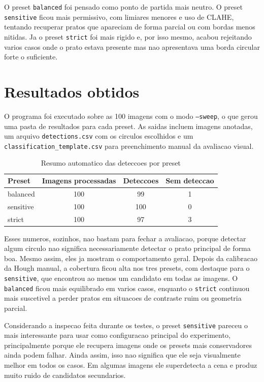 \documentclass[12pt,a4paper]{article}
\begin{document}
O preset \texttt{balanced} foi pensado como ponto de partida mais neutro. O preset \texttt{sensitive} ficou mais permissivo, com limiares menores e uso de CLAHE, tentando recuperar pratos que apareciam de forma parcial ou com bordas menos nitidas. Ja o preset \texttt{strict} foi mais rigido e, por isso mesmo, acabou rejeitando varios casos onde o prato estava presente mas nao apresentava uma borda circular forte o suficiente.

\section{Resultados obtidos}

O programa foi executado sobre as 100 imagens com o modo \texttt{--sweep}, o que gerou uma pasta de resultados para cada preset. As saidas incluem imagens anotadas, um arquivo \texttt{detections.csv} com os circulos escolhidos e um \texttt{classification\_template.csv} para preenchimento manual da avaliacao visual.

\begin{table}[H]
    \centering
    \caption{Resumo automatico das deteccoes por preset}
    \begin{tabular}{lccc}
        \toprule
        Preset & Imagens processadas & Deteccoes & Sem deteccao \\
        \midrule
        balanced  & 100 & 99  & 1 \\
        sensitive & 100 & 100 & 0 \\
        strict    & 100 & 97  & 3 \\
        \bottomrule
    \end{tabular}
\end{table}

Esses numeros, sozinhos, nao bastam para fechar a avaliacao, porque detectar algum circulo nao significa necessariamente detectar o prato principal de forma boa. Mesmo assim, eles ja mostram o comportamento geral. Depois da calibracao da Hough manual, a cobertura ficou alta nos tres presets, com destaque para o \texttt{sensitive}, que encontrou ao menos um candidato em todas as imagens. O \texttt{balanced} ficou mais equilibrado em varios casos, enquanto o \texttt{strict} continuou mais suscetivel a perder pratos em situacoes de contraste ruim ou geometria parcial.

Considerando a inspecao feita durante os testes, o preset \texttt{sensitive} pareceu o mais interessante para usar como configuracao principal do experimento, principalmente porque ele recupera imagens onde os presets mais conservadores ainda podem falhar. Ainda assim, isso nao significa que ele seja visualmente melhor em todos os casos. Em algumas imagens ele superdetecta a cena e produz muito ruido de candidatos secundarios.
\end{document}

